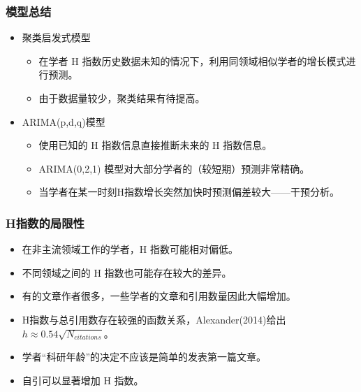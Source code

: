 \documentclass[11pt,compress,t, xcolor=table]{beamer}
\begin{document}
\begin{frame}
	\frametitle{模型总结}
	
	
	\begin{itemize}
		\item \textcolor{TsinghuaPurple}{聚类启发式模型}
		\smallskip
		\begin{itemize}
			\item 在学者 H 指数历史数据\textcolor{TsinghuaPurple}{未知}的情况下，利用同领域相似学者的增长模式进行预测。
			\smallskip
			\item 由于数据量较少，聚类结果有待提高。
			\smallskip
		\end{itemize}
		
		\item \textcolor{TsinghuaPurple}{ARIMA(p,d,q)模型}
		\smallskip
		\begin{itemize}
			\item 使用\textcolor{TsinghuaPurple}{已知}的 H 指数信息直接推断未来的 H 指数信息。
			\smallskip
			\item ARIMA(0,2,1) 模型对大部分学者的（较短期）预测非常精确。
			\smallskip
			\item 当学者在某一时刻H指数增长突然加快时预测偏差较大——干预分析。
		\end{itemize}
	\end{itemize}

	
	
\end{frame}


\begin{frame}
	\frametitle{H指数的局限性}
	\begin{itemize}	
		\item 在非主流领域工作的学者，H 指数可能相对偏低。
		\smallskip	
		\item 不同领域之间的 H 指数也可能存在较大的差异。
		\smallskip	
		\item 有的文章作者很多，一些学者的文章和引用数量因此大幅增加。
		\smallskip
		\item H指数与总引用数存在较强的函数关系，\textcolor{TsinghuaPurple}{Alexander(2014)}给出 $h \approx 0.54\sqrt{N_{citations}}$。
		\smallskip
		\item 学者“科研年龄”的决定不应该是简单的发表第一篇文章。
		\smallskip
		\item 自引可以显著增加 H 指数。
	\end{itemize}
	
\end{frame}
\end{document}
